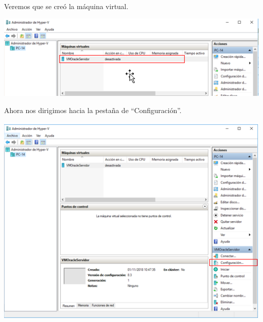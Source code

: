 \vspace{\baselineskip}

Veremos que se creó la máquina virtual. 
	\begin{center}
		\includegraphics[width=17cm]{./Imagenes/22} 
	\end{center} 

\vspace{\baselineskip}

Ahora nos dirigimos hacia la pestaña de “Configuración”.
	\begin{center}
		\includegraphics[width=17cm]{./Imagenes/23} 
	\end{center} 

\newpage

